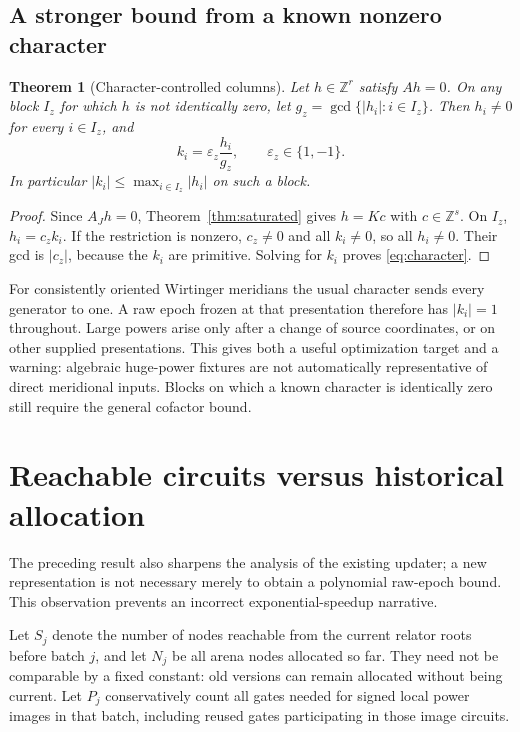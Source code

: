 \documentclass[11pt,letterpaper]{article}
\newtheorem{theorem}{Theorem}[section]
\theoremstyle{definition}
\theoremstyle{remark}\newtheorem{remark}[theorem]{Remark}
\newcommand{\Z}{\mathbb Z}\newcommand{\Q}{\mathbb Q}
\begin{document}
\subsection{A stronger bound from a known nonzero character}

\begin{theorem}[Character-controlled columns]
\label{thm:character}
Let $h\in\Z^r$ satisfy $Ah=0$. On any block $I_z$ for which $h$ is not
identically zero, let $g_z=\gcd\{|h_i|:i\in I_z\}$. Then $h_i\ne0$ for
every $i\in I_z$, and
\begin{equation}
 k_i=\varepsilon_z\frac{h_i}{g_z},\qquad \varepsilon_z\in\{1,-1\}.
 \label{eq:character}
\end{equation}
In particular $|k_i|\le\max_{i\in I_z}|h_i|$ on such a block.
\end{theorem}
\begin{proof}
Since $A_Jh=0$, Theorem~\ref{thm:saturated} gives $h=Kc$ with $c\in\Z^s$.
On $I_z$, $h_i=c_zk_i$. If the restriction is nonzero, $c_z\ne0$ and
all $k_i\ne0$, so all $h_i\ne0$. Their gcd is $|c_z|$, because the $k_i$
are primitive. Solving for $k_i$ proves \eqref{eq:character}.
\end{proof}

For consistently oriented Wirtinger meridians the usual character sends every
generator to one. A raw epoch frozen at that presentation therefore has
$|k_i|=1$ throughout. Large powers arise only after a change of source
coordinates, or on other supplied presentations. This gives both a useful
optimization target and a warning: algebraic huge-power fixtures are not
automatically representative of direct meridional inputs. Blocks on which a
known character is identically zero still require the general cofactor bound.

\section{Reachable circuits versus historical allocation}
\label{sec:native}

The preceding result also sharpens the analysis of the existing updater;
a new representation is not necessary merely to obtain a polynomial raw-epoch
bound. This observation prevents an incorrect exponential-speedup narrative.

Let $S_j$ denote the number of nodes reachable from the current relator roots
before batch $j$, and let $N_j$ be all arena nodes allocated so far. They need
not be comparable by a fixed constant: old versions can remain allocated
without being current. Let $P_j$ conservatively count all gates needed for
signed local power images in that batch, including reused gates participating
in those image circuits.
\end{document}
